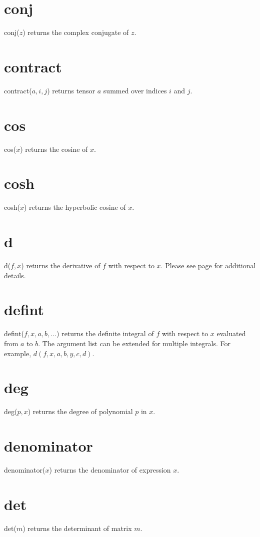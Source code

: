 \documentclass[12pt]{book}
\begin{document}
\section*{conj}
conj($z$) returns the complex conjugate of $z$.

\section*{contract}
contract($a,i,j$) returns tensor $a$ summed over indices $i$ and $j$.

\section*{cos}
cos($x$) returns the cosine of $x$.

\section*{cosh}
cosh($x$) returns the hyperbolic cosine of $x$.

\section*{d}
d($f,x$) returns the derivative of $f$ with respect to $x$.
Please see page \pageref{d} for additional details.

\section*{defint}
defint($f,x,a,b,\ldots$)
returns the definite integral of $f$ with respect to $x$ evaluated from $a$ to $b$.
The argument list can be extended for multiple integrals.
For example, $d(f,x,a,b,y,c,d)$.

\section*{deg}
deg($p,x$) returns the degree of polynomial $p$ in $x$.

\section*{denominator}
denominator($x$) returns the denominator of expression $x$.

\section*{det}
det($m$) returns the determinant of matrix $m$.
\end{document}
